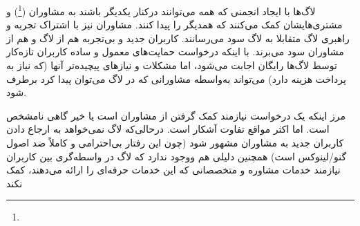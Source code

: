 لاگ‌ها با ایجاد انجمنی که همه می‌توانند درکنار یکدیگر باشند
به مشاوران
(\emph{}\footnote{})
 و مشتری‌هایشان کمک می‌کنند که همدیگر را پیدا کنند.
مشاوران نیز با اشتراک تجربه و راهبری لاگ‌ متقابلا به لاگ سود می‌رسانند.
کاربران جدید و بی‌تجربه هم از لاگ و هم از مشاوران سود می‌برند.
با اینکه درخواست حمایت‌های معمول و ساده کاربران تازه‌کار توسط لاگ‌ها
رایگان اجابت می‌شود، اما مشکلات و نیازهای پیچیده‌تر آنها (که نیاز
به پرداخت هزینه دارد) می‌تواند به‌واسطه مشاورانی که در لاگ می‌توان پیدا
کرد برطرف شود.

مرز اینکه یک درخواست نیازمند کمک گرفتن از مشاوران است یا خیر گاهی
نامشخص است. اما اکثر مواقع تفاوت آشکار است.
درحالی‌که لاگ نمی‌خواهد به ارجاع دادن کاربران جدید به مشاوران مشهور
شود (چون این رفتار بی‌احترامی و کاملاً ضد اصول گنو/لینوکس است) همچنین
دلیلی هم ووجود ندارد که لاگ در واسطه‌گری بین کاربران نیازمند خدمات مشاوره و متخصصانی که این خدمات حرفه‌ای را ارائه می‌دهند، کمک نکند

